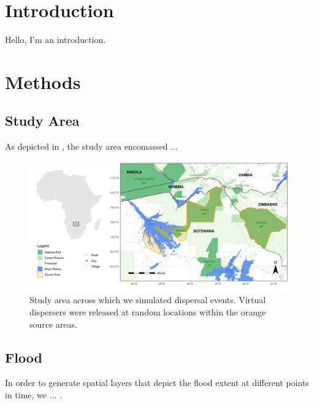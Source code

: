 \documentclass[abstract=on,10pt,a4paper,bibliography=totocnumbered]{article}
\begin{document}
\newpage

\onehalfspacing
\tableofcontents
\doublespacing

\newpage
{}


\section{Introduction}
Hello, I'm an introduction.

\section{Methods}

\subsection{Study Area}
As depicted in , the study area encomassed ...

\begin{figure}
  \begin{center}
  \includegraphics[width = \textwidth]{99_StudyArea.png}
  \caption{Study area across which we simulated dispersal events. Virtual
  dispersers were released at random locations within the orange source areas.}
  \label{StudyArea}
  \end{center}
\end{figure}

\subsection{Flood}
In order to generate spatial layers that depict the flood extent at different
points in time, we ... .
\end{document}
